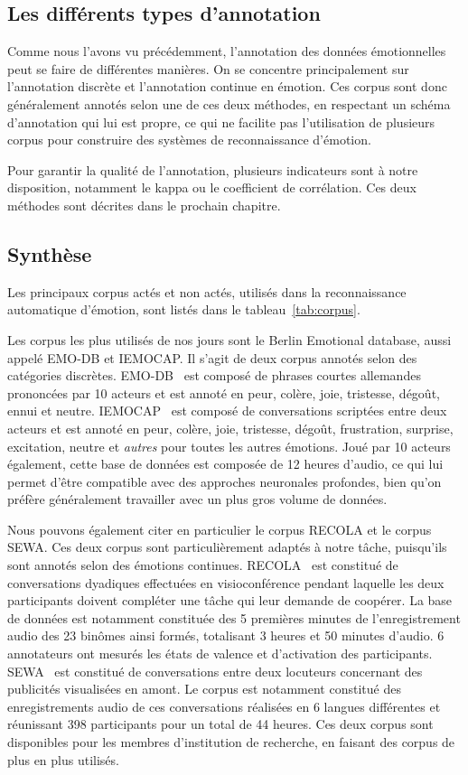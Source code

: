 \subsection{Les différents types d'annotation}
Comme nous l'avons vu précédemment, l'annotation des données émotionnelles peut se faire de différentes manières. On se concentre principalement sur l'annotation discrète et l'annotation continue en émotion. Ces corpus sont donc généralement annotés selon une de ces deux méthodes, en respectant un schéma d'annotation qui lui est propre, ce qui ne facilite pas l'utilisation de plusieurs corpus pour construire des systèmes de reconnaissance d'émotion.

Pour garantir la qualité de l'annotation, plusieurs indicateurs sont à notre disposition, notamment le kappa ou le coefficient de corrélation. Ces deux méthodes sont décrites dans le prochain chapitre.

\subsection{Synthèse}



Les principaux corpus actés et non actés, utilisés dans la reconnaissance automatique d'émotion, sont listés dans le tableau~\ref{tab:corpus}.

Les corpus les plus utilisés de nos jours sont le Berlin Emotional database, aussi appelé EMO-DB et IEMOCAP. Il s'agit de deux corpus annotés selon des catégories discrètes. EMO-DB~\cite{Burkhardt2005} est composé de phrases courtes allemandes prononcées par 10 acteurs et est annoté en peur, colère, joie, tristesse, dégoût, ennui et neutre. IEMOCAP~\cite{Busso2007} est composé de conversations scriptées entre deux acteurs et est annoté en peur, colère, joie, tristesse, dégoût, frustration, surprise, excitation, neutre et \textit{autres} pour toutes les autres émotions. Joué par 10 acteurs également, cette base de données est composée de 12 heures d'audio, ce qui lui permet d'être compatible avec des approches neuronales profondes, bien qu'on préfère généralement travailler avec un plus gros volume de données.

Nous pouvons également citer en particulier le corpus RECOLA et le corpus SEWA. Ces deux corpus sont particulièrement adaptés à notre tâche, puisqu'ils sont annotés selon des émotions continues.
RECOLA~\cite{Ringeval2013} est constitué de conversations dyadiques effectuées en visioconférence pendant laquelle les deux participants doivent compléter une tâche qui leur demande de coopérer. La base de données est notamment constituée des 5 premières minutes de l'enregistrement audio des 23 binômes ainsi formés, totalisant 3 heures et 50 minutes d'audio. 6 annotateurs ont mesurés les états de valence et d'activation des participants.
SEWA~\cite{SEWA} est constitué de conversations entre deux locuteurs concernant des publicités visualisées en amont. Le corpus est notamment constitué des enregistrements audio de ces conversations réalisées en 6 langues différentes et réunissant 398 participants pour un total de 44 heures. Ces deux corpus sont disponibles pour les membres d'institution de recherche, en faisant des corpus de plus en plus utilisés.

